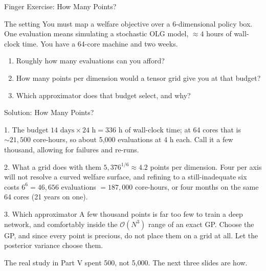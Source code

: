 \documentclass[aspectratio=169,11pt]{beamer}
\newcommand{\emphc}[1]{\textcolor{harvardcrimson}{#1}}
\newcommand{\exercisepause}{%
  \tikz[baseline=(XB.base)]{%
    \node[rectangle, rounded corners=2pt, fill=softgreen!25, draw=softgreen!70!black,
          inner xsep=4pt, inner ysep=1.5pt,
          font=\footnotesize\bfseries, text=darkgreen] (XB) {PAUSE: 5 min};}}
\begin{document}
\begin{frame}{Finger Exercise: How Many Points?}
\begin{flushright}\exercisepause{}\end{flushright}
\vspace{-0.35cm}
\begin{exampleblock}{The setting}
You must map a welfare objective over a \emphc{6-dimensional} policy box. One evaluation means simulating a stochastic OLG model, $\approx 4$ hours of wall-clock time. You have a 64-core machine and \emphc{two weeks}.
\end{exampleblock}

\vspace{0.4cm}
\begin{enumerate}\itemsep6pt
  \item Roughly how many evaluations can you afford?
  \item How many points per dimension would a tensor grid give you at that budget?
  \item Which approximator does that budget select, and why?
\end{enumerate}
\end{frame}

\begin{frame}{Solution: How Many Points?}
\small
\begin{block}{1. The budget}
$14 \text{ days} \times 24 \text{ h} = 336$ h of wall-clock time; at 64 cores that is ${\sim}21{,}500$ core-hours, so about \emphc{5{,}000 evaluations} at 4 h each. Call it a few thousand, allowing for failures and re-runs.
\end{block}

\begin{block}{2. What a grid does with them}
$5{,}376^{1/6} \approx 4.2$ points per dimension. Four per axis will not resolve a curved welfare surface, and refining to a still-inadequate six costs $6^6 = 46{,}656$ evaluations $= 187{,}000$ core-hours, or \emphc{four months} on the same 64 cores (21 years on one).
\end{block}

\begin{block}{3. Which approximator}
A few thousand points is far too few to train a deep network, and comfortably inside the $\mathcal{O}(N^3)$ range of an exact GP. \emphc{Choose the GP}, and since every point is precious, do not place them on a grid at all. Let the posterior variance choose them.
\end{block}

\vspace{0.1cm}
{\footnotesize The real study in Part V spent \emphc{500}, not 5{,}000. The next three slides are how.}
\end{frame}
\end{document}
